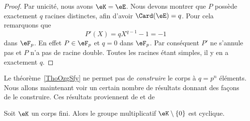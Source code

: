 \begin{proof}
	Par unicité, nous avons \( \eK=\eE\). Nous devons montrer que \( P\) possède exactement \( q\) racines distinctes, afin d'avoir \( \Card(\eE)=q\). Pour cela remarquons que
	\begin{equation}
		P'(X)=qX^{q-1}-1=-1
	\end{equation}
	dans \( \eF_p\). En effet \( P\in\eF_p\) et \( q=0\) dans \( \eF_p\). Par conséquent \( P'\) ne s'annule pas et \( P\) n'a pas de racine double. Toutes les racines étant simples, il y en a exactement \( q\).
\end{proof}

Le théorème~\ref{ThoOzgSfy} ne permet pas de \emph{construire} le corps à \( q=p^n\) éléments. Nous allons maintenant voir un certain nombre de résultats donnant des façons de le construire. Ces résultats proviennent de \cite{MichelMerlecorpsfinis,GabrielPeyre,RodierCorpsFinis} et de 

\begin{proposition}      \label{PropnfebjI}
	Soit \( \eK\) un corps fini. Alors le groupe multiplicatif \( \eK\setminus\{ 0 \}\) est cyclique.
\end{proposition}

